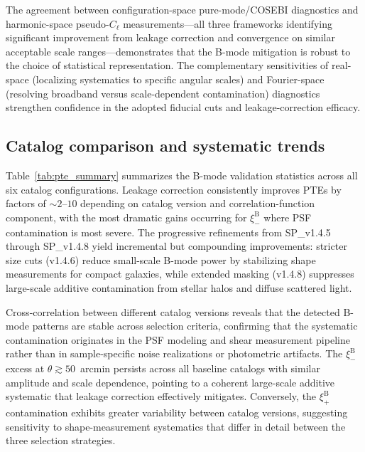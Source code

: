 \documentclass{aa}
\begin{document}
The agreement between configuration-space pure-mode/COSEBI diagnostics and harmonic-space pseudo-$C_\ell$ measurements—all three frameworks identifying significant improvement from leakage correction and convergence on similar acceptable scale ranges—demonstrates that the B-mode mitigation is robust to the choice of statistical representation. The complementary sensitivities of real-space (localizing systematics to specific angular scales) and Fourier-space (resolving broadband versus scale-dependent contamination) diagnostics strengthen confidence in the adopted fiducial cuts and leakage-correction efficacy.

\subsection{Catalog comparison and systematic trends}

Table~\ref{tab:pte_summary} summarizes the B-mode validation statistics across all six catalog configurations. Leakage correction consistently improves PTEs by factors of $\sim 2$--$10$ depending on catalog version and correlation-function component, with the most dramatic gains occurring for $\xi_-^{\mathrm{B}}$ where PSF contamination is most severe. The progressive refinements from SP\_v1.4.5 through SP\_v1.4.8 yield incremental but compounding improvements: stricter size cuts (v1.4.6) reduce small-scale B-mode power by stabilizing shape measurements for compact galaxies, while extended masking (v1.4.8) suppresses large-scale additive contamination from stellar halos and diffuse scattered light.

Cross-correlation between different catalog versions reveals that the detected B-mode patterns are stable across selection criteria, confirming that the systematic contamination originates in the PSF modeling and shear measurement pipeline rather than in sample-specific noise realizations or photometric artifacts. The $\xi_-^{\mathrm{B}}$ excess at $\theta \gtrsim 50$~arcmin persists across all baseline catalogs with similar amplitude and scale dependence, pointing to a coherent large-scale additive systematic that leakage correction effectively mitigates. Conversely, the $\xi_+^{\mathrm{B}}$ contamination exhibits greater variability between catalog versions, suggesting sensitivity to shape-measurement systematics that differ in detail between the three selection strategies.
\end{document}
